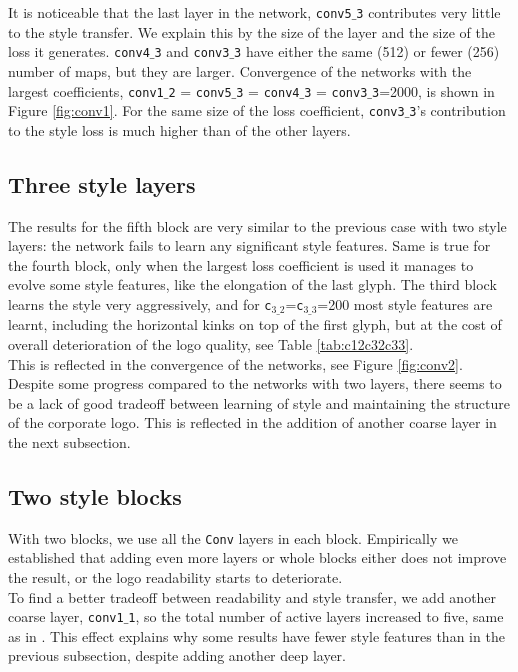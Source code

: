 \documentclass[a4paper,twoside]{article}
\begin{document}
\noindent It is noticeable that the last layer in the network, \texttt{conv5${}\_{}$3} contributes very little to the style transfer. We explain this by the size of the layer and the size of the loss it generates. \texttt{conv4${}\_{}$3} and \texttt{conv3${}\_{}$3} have either the same (512) or fewer (256) number of maps, but they are larger. Convergence of the networks with the largest coefficients, \texttt{conv1${}\_{}$2} = \texttt{conv5${}\_{}$3} = \texttt{conv4${}\_{}$3} = \texttt{conv3${}\_{}$3}=2000, is shown in Figure \ref{fig:conv1}. For the same size of the loss coefficient, \texttt{conv3${}\_{}$3}'s contribution to the style loss is much higher than of the other layers.   






\subsection{Three style layers}
The results for the fifth block are very similar to the previous case with two style layers: the network fails to learn any significant style features. Same is true for the fourth block, only when the largest loss coefficient is used it manages to evolve some style features, like the elongation of the last glyph. The third block learns the style very aggressively, and for \texttt{c$_{3\_2}$}=\texttt{c$_{3\_3}$}=200 most style features are learnt, including the horizontal kinks on top of the first glyph, but at the cost of overall deterioration of the logo quality, see Table \ref{tab:c12c32c33}.\\

\noindent This is reflected in the convergence of the networks, see Figure \ref{fig:conv2}. Despite some progress compared to the networks with two layers, there seems to be a lack of good tradeoff between learning of style and maintaining the structure of the corporate logo. This is reflected in the addition of another coarse layer in the next subsection.   
\subsection{Two style blocks} 
\noindent With two blocks, we use all the \texttt{Conv} layers in each block. Empirically we established that adding even more layers or whole blocks either does not improve the result, or the logo readability starts to deteriorate.\\

\noindent To find a better tradeoff between readability and style transfer, we add another coarse layer, \texttt{conv1${}\_{}$1}, so the total number of active layers increased to five, same as in \cite{gatys2016image}. This effect explains why some results have fewer style features than in the previous subsection, despite adding another deep layer.\\ 
\end{document}
